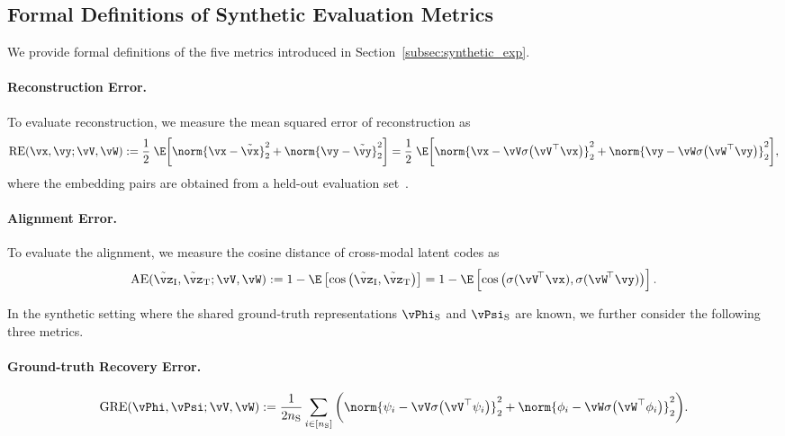 \subsection{Formal Definitions of Synthetic Evaluation Metrics}
\label{app:synth_metrics}

We provide formal definitions of the five metrics introduced in Section~\ref{subsec:synthetic_exp}.

\paragraph{Reconstruction Error.}
To evaluate reconstruction, we measure the mean squared error of reconstruction as
\begin{equation}
    \mathrm{RE}(\vx, \vy; \vV,\vW)
    :=
    \frac{1}{2}\;
    \E
    \bigg[
    \norm{\vx-\tilde\vx}_2^2 + \norm{\vy-\tilde\vy}_2^2
    \bigg]
    =
    \frac{1}{2}\;
    \E
    \bigg[
    \norm{\vx- \vV\sigma\big(\vV^\top \vx\big)}_2^2 + \norm{\vy-\vW\sigma\big(\vW^\top \vy\big)}_2^2
    \bigg]
    ,
\end{equation}
where the embedding pairs are obtained from a held-out evaluation set~\citep{karvonen2025saebench}.

\paragraph{Alignment Error.}
To evaluate the alignment, we measure the cosine distance of cross-modal latent codes as
\begin{equation}
    \mathrm{AE}(\tilde \vz_{\mathrm I},\tilde \vz_{\mathrm T}; \vV,\vW)
    :=
    1-
    \E
    \left[
    \cos\big(\tilde \vz_{\mathrm I},\tilde \vz_{\mathrm T}\big)
    \right]
    =
    1-
    \E
    \left[
    \cos\big(\sigma(\vV^{\!\top}\vx),\sigma(\vW^{\!\top}\vy)\big)
    \right].
\end{equation}

In the synthetic setting where the shared ground-truth representations $\vPhi_{\mathrm S}$ and $\vPsi_{\mathrm S}$ are known, we further consider the following three metrics.

\paragraph{Ground-truth Recovery Error.}
\begin{equation}
    \mathrm{GRE}(\vPhi, \vPsi; \vV,\vW)
    :=
    \frac{1}{2n_{\mathrm S}}\sum_{i\in[n_{\mathrm S}]}
    \bigg(
    \norm{\psi_i- \vV\sigma\big(\vV^\top \psi_i\big)}_2^2 + \norm{\phi_i-\vW\sigma\big(\vW^\top \phi_i\big)}_2^2
    \bigg)
    .
\end{equation}

